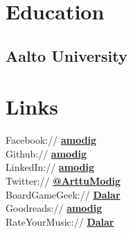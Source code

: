 \documentclass[]{deedy-resume-openfont}
\begin{document}
%
%
\lastupdated

%
%

%
%

\begin{minipage}[t]{0.33\textwidth} 


\section{Education} 

\subsection{Aalto University}
\vspace{0.5em}
\sectionsep


\section{Links} 
Facebook:// \href{https://facebook.com/amodig}{\bf amodig} \\
Github:// \href{https://github.com/amodig}{\bf amodig} \\
LinkedIn:// \href{https://www.linkedin.com/in/amodig}{\bf amodig} \\
Twitter:// \href{https://twitter.com/ArttuModig}{\bf @ArttuModig} \\
\sectionsep
{}
BoardGameGeek:// \href{https://boardgamegeek.com/user/dalar}{\bf Dalar} \\
Goodreads:// \href{https://goodreads.com/amodig}{\bf amodig} \\
RateYourMusic:// \href{https://rateyourmusic.com/~Dalar}{\bf Dalar} \\
\sectionsep


\end{minipage}
\end{document}
